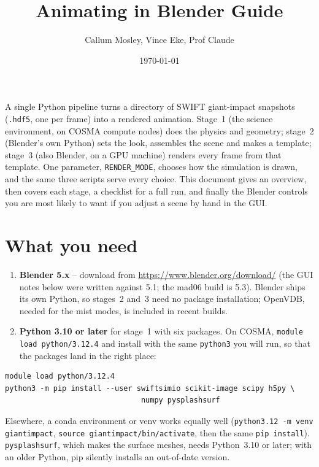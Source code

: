 \documentclass[11pt]{article}
\title{\textbf{Animating in Blender Guide}\\[2pt]}
\author{Callum Mosley, Vince Eke, Prof Claude}
\date{\today}
\newcommand{\pc}[1]{\texttt{#1}}
\begin{document}
\sloppy
\maketitle
 
\noindent
A single Python pipeline turns a directory of SWIFT giant-impact snapshots (\pc{.hdf5}, one per frame) into a rendered animation. Stage~1 (the science environment, on COSMA compute nodes) does the physics and geometry; stage~2 (Blender's own Python) sets the look, assembles the scene and makes a template; stage~3 (also Blender, on a GPU machine) renders every frame from that template. One parameter, \pc{RENDER\_MODE}, chooses how the simulation is drawn, and the same three scripts serve every choice. This document gives an overview, then covers each stage, a checklist for a full run, and finally the Blender controls you are most likely to want if you adjust a scene by hand in the GUI.
 
\section{What you need}
\begin{enumerate}
  \item \textbf{Blender 5.x} -- download from
        \url{https://www.blender.org/download/} (the GUI notes below were written against 5.1; the mad06 build is 5.3). Blender ships its own Python, so stages~2 and~3 need no
        package installation; OpenVDB, needed for the mist modes, is included in recent builds.
  \item \textbf{Python 3.10 or later} for stage~1 with six packages. On COSMA, \pc{module load python/3.12.4} and install with the same \pc{python3} you will run, so that the packages land in the right place:
\end{enumerate}
 
\begin{verbatim}
module load python/3.12.4
python3 -m pip install --user swiftsimio scikit-image scipy h5py \
                               numpy pysplashsurf
\end{verbatim}
 
Elsewhere, a conda environment or venv works equally well (\pc{python3.12 -m venv giantimpact}, \pc{source giantimpact/bin/activate}, then the same \pc{pip install}). \pc{pysplashsurf}, which makes the surface meshes, needs Python~3.10 or later; with an older Python, pip silently installs an out-of-date version.
 
\end{document}
